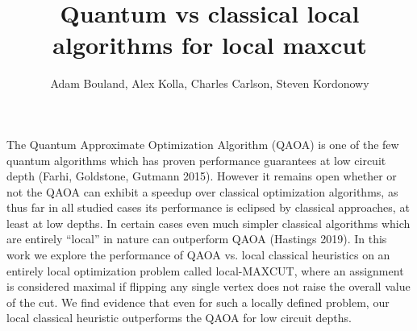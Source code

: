 \documentclass[10pt]{article}
\begin{document}
\title{Quantum vs classical local algorithms for local maxcut}
\author{Adam Bouland, Alex Kolla, Charles Carlson, Steven Kordonowy}
\date{}
\maketitle

The Quantum Approximate Optimization Algorithm (QAOA) is one of the few quantum algorithms which has proven performance guarantees at low circuit depth (Farhi, Goldstone, Gutmann 2015). However it remains open whether or not the QAOA can exhibit a speedup over classical optimization algorithms, as thus far in all studied cases its performance is eclipsed by classical approaches, at least at low depths. In certain cases even much simpler classical algorithms which are entirely ``local'' in nature can outperform QAOA (Hastings 2019). In this work we explore the performance of QAOA vs. local classical heuristics on an entirely local optimization problem called local-MAXCUT, where an assignment is considered maximal if flipping any single vertex does not raise the overall value of the cut. We find evidence that even for such a locally defined problem, our local classical heuristic outperforms the QAOA for low circuit depths.

 
% 

\end{document}
